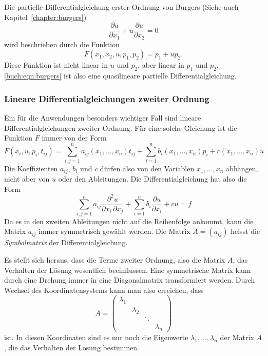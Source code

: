 \begin{beispiel}
Die partielle Differentialgleichung erster Ordnung von Burgers
(Siehe auch Kapitel~\ref{chapter:burgers})
\begin{equation}
\frac{\partial u}{\partial x_1}
+
u
\frac{\partial u}{\partial x_2}
=
0
\label{buch:eqn:burgers}
\end{equation}
wird beschrieben durch die Funktion
\[
F(x_1,x_2,u,p_1,p_2)
=
p_1+up_2.
\]
Diese Funktion ist nicht linear in $u$ und $p_2$, aber linear in
$p_1$ und $p_2$.
\eqref{buch:eqn:burgers} ist also eine quasilineare partielle
Differentialgleichung.
\end{beispiel}

\subsubsection{Lineare Differentialgleichungen zweiter Ordnung}
Ein für die Anwendungen besonders wichtiger Fall sind lineare
Differentialgleichungen zweiter Ordnung.
Für eine solche Gleichung ist die Funktion $F$ immer von der Form
\[
F(x_i,u,p_i,t_{ij})
=
\sum_{i,j=1}^n a_{ij}(x_1,\dots,x_n)t_{ij} + \sum_{i=1}^n b_i(x_1,\dots,x_n) p_i + c(x_1,\dots,x_n) u 
\]
Die Koeffizienten $a_{ij}$, $b_i$ und $c$ dürfen also von den Variablen
$x_1,\dots,x_n$ abhängen, nicht aber von $u$ oder den Ableitungen.
Die Differentialgleichung hat also die Form
\begin{equation}
\sum_{i,j=1}^n
a_{ij}\frac{\partial^2 u}{\partial x_i\,\partial x_j}
+
\sum_{i=1}^n
b_i\frac{\partial u}{\partial x_i}
+
cu
=
f
\label{pde:eqn:eqn2nd}
\end{equation}
Da es in den zweiten Ableitungen nicht auf die Reihenfolge ankommt,
kann die Matrix $a_{ij}$ immer symmetrisch gewählt werden.
Die Matrix $A=(a_{ij})$ heisst die {\em Symbolmatrix} der Differentialgleichung.

Es stellt sich heraus, dass die Terme zweiter Ordnung, also die 
Matrix $A$, das Verhalten der Lösung wesentlich beeinflussen.
Eine symmetrische Matrix kann durch eine Drehung immer in eine
Diagonalmatrix transformiert werden.
Durch Wechsel des Koordinatensystems kann man also erreichen, dass
\[
A
=
\begin{pmatrix}
\lambda_1&         &      &         \\
         &\lambda_2&      &         \\
         &         &\ddots&         \\
         &         &      &\lambda_n
\end{pmatrix}
\]
ist.
In diesen Koordinaten sind es nur noch die Eigenwerte
$\lambda_1,\dots,\lambda_n$ der Matrix $A$, die das Verhalten der Lösung
bestimmen.

